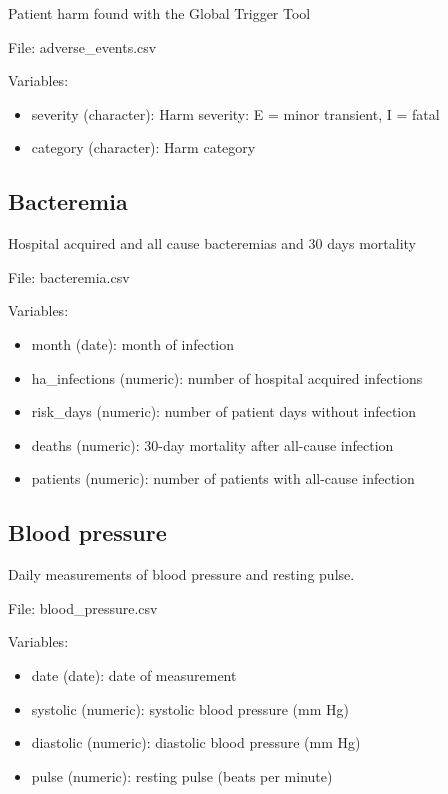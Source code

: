 \documentclass[
]{book}
\providecommand{\tightlist}{%
  \setlength{\itemsep}{0pt}\setlength{\parskip}{0pt}}
\begin{document}
Patient harm found with the Global Trigger Tool

File: adverse\_events.csv

Variables:

\begin{itemize}
\tightlist
\item
  severity (character): Harm severity: E = minor transient, I = fatal
\item
  category (character): Harm category
\end{itemize}

\subsection*{Bacteremia}\label{bacteremia}

Hospital acquired and all cause bacteremias and 30 days mortality

File: bacteremia.csv

Variables:

\begin{itemize}
\tightlist
\item
  month (date): month of infection
\item
  ha\_infections (numeric): number of hospital acquired infections
\item
  risk\_days (numeric): number of patient days without infection
\item
  deaths (numeric): 30-day mortality after all-cause infection
\item
  patients (numeric): number of patients with all-cause infection
\end{itemize}

\subsection*{Blood pressure}\label{blood-pressure}

Daily measurements of blood pressure and resting pulse.

File: blood\_pressure.csv

Variables:

\begin{itemize}
\tightlist
\item
  date (date): date of measurement
\item
  systolic (numeric): systolic blood pressure (mm Hg)
\item
  diastolic (numeric): diastolic blood pressure (mm Hg)
\item
  pulse (numeric): resting pulse (beats per minute)
\end{itemize}
\end{document}
